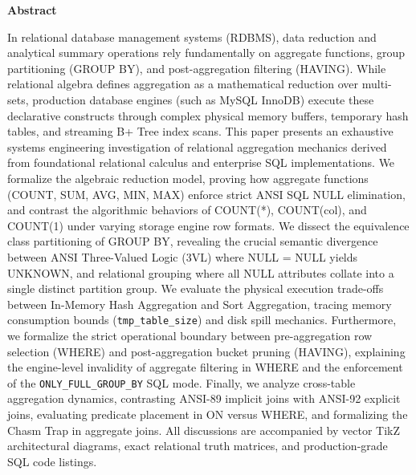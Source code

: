 \documentclass[10pt,twocolumn,letterpaper]{article}
\begin{document}

\thispagestyle{firstpage}

\begin{center}
  {\bfseries\large Abstract}
\end{center}
\vspace{-0.5em}
{\small In relational database management systems (RDBMS), data reduction and analytical summary operations rely fundamentally on aggregate functions, group partitioning (GROUP BY), and post-aggregation filtering (HAVING). While relational algebra defines aggregation as a mathematical reduction over multi-sets, production database engines (such as MySQL InnoDB) execute these declarative constructs through complex physical memory buffers, temporary hash tables, and streaming B+ Tree index scans. This paper presents an exhaustive systems engineering investigation of relational aggregation mechanics derived from foundational relational calculus and enterprise SQL implementations. We formalize the algebraic reduction model, proving how aggregate functions (COUNT, SUM, AVG, MIN, MAX) enforce strict ANSI SQL NULL elimination, and contrast the algorithmic behaviors of COUNT(*), COUNT(col), and COUNT(1) under varying storage engine row formats. We dissect the equivalence class partitioning of GROUP BY, revealing the crucial semantic divergence between ANSI Three-Valued Logic (3VL) where NULL = NULL yields UNKNOWN, and relational grouping where all NULL attributes collate into a single distinct partition group. We evaluate the physical execution trade-offs between In-Memory Hash Aggregation and Sort Aggregation, tracing memory consumption bounds (\texttt{tmp\_table\_size}) and disk spill mechanics. Furthermore, we formalize the strict operational boundary between pre-aggregation row selection (WHERE) and post-aggregation bucket pruning (HAVING), explaining the engine-level invalidity of aggregate filtering in WHERE and the enforcement of the \texttt{ONLY\_FULL\_GROUP\_BY} SQL mode. Finally, we analyze cross-table aggregation dynamics, contrasting ANSI-89 implicit joins with ANSI-92 explicit joins, evaluating predicate placement in ON versus WHERE, and formalizing the Chasm Trap in aggregate joins. All discussions are accompanied by vector TikZ architectural diagrams, exact relational truth matrices, and production-grade SQL code listings.}
\end{document}
